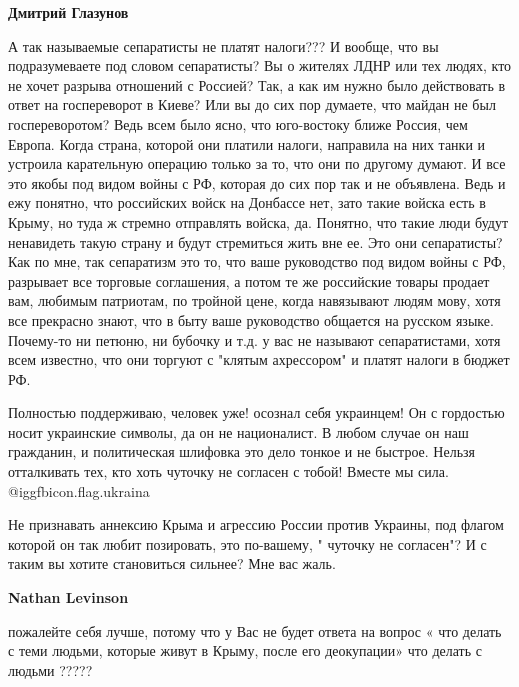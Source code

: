 \begin{itemize}
\begin{itemize}
\textbf{Дмитрий Глазунов} 

А так называемые сепаратисты не платят налоги??? И вообще, что вы
подразумеваете под словом сепаратисты? Вы о жителях ЛДНР или тех людях, кто не
хочет разрыва отношений с Россией? Так, а как им нужно было действовать в ответ
на госпереворот в Киеве? Или вы до сих пор думаете, что майдан не был
госпереворотом? Ведь всем было ясно, что юго-востоку ближе Россия, чем Европа.
Когда страна, которой они платили налоги, направила на них танки и устроила
карательную операцию только за то, что они по другому думают. И все это якобы
под видом войны с РФ, которая до сих пор так и не объявлена. Ведь и ежу
понятно, что российских войск на Донбассе нет, зато такие войска есть в Крыму,
но туда ж стремно отправлять войска, да. Понятно, что такие люди будут
ненавидеть такую страну и будут стремиться жить вне ее. Это они сепаратисты?
Как по мне, так сепаратизм это то, что ваше руководство под видом войны с РФ,
разрывает все торговые соглашения, а потом те же российские товары продает вам,
любимым патриотам, по тройной цене, когда навязывают людям мову, хотя все
прекрасно знают, что в быту ваше руководство общается на русском языке.
Почему-то ни петюню, ни бубочку и т.д. у вас не называют сепаратистами, хотя
всем известно, что они торгуют с "клятым ахрессором" и платят налоги в бюджет
РФ.

\end{itemize} %


Полностью поддерживаю, человек уже! осознал себя украинцем! Он с гордостью
носит украинские символы, да он не националист. В любом случае он наш
гражданин, и политическая шлифовка это дело тонкое и не быстрое. Нельзя
отталкивать тех, кто хоть чуточку не согласен с тобой! Вместе мы сила. 
@igg{fbicon.flag.ukraina}

\begin{itemize} %

Не признавать аннексию Крыма и агрессию России против Украины, под флагом
которой он так любит позировать, это по-вашему, " чуточку не согласен"? И с
таким вы хотите становиться сильнее? Мне вас жаль.

\textbf{Nathan Levinson} 

пожалейте себя лучше, потому что у Вас не будет ответа на вопрос « что делать с
теми людьми, которые живут в Крыму, после его деокупации» что делать с людьми
?????



\end{itemize}
\end{itemize}
